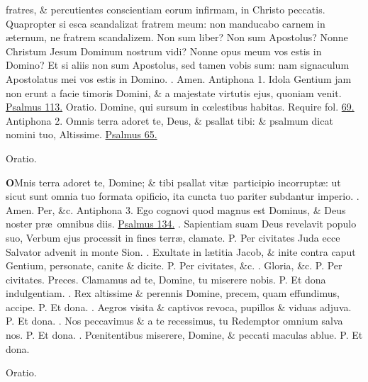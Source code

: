 \documentclass[letter,11pt]{book}
\makeatletter
\DeclareRobustCommand{\Vbar}{\vers@resp{-0.1em}{V}}
\DeclareRobustCommand{\Rbar}{\vers@resp{0pt}{R}}
\newcommand{\vers@resp@sym}{\raisebox{0.2ex}{\rotatebox[origin=c]{-20}{$\m@th\rceil$}}}
\newcommand{\vers@resp}[2]{%
  {\ooalign{\hidewidth\kern#1\vers@resp@sym\hidewidth\cr#2\cr}}%
}%
\def\P{\color{Red} P. \color{black}}
\def\V{\color{Red} \Vbar . \color{black}}
\def\R{\color{Red} \Rbar . \color{black}}
\makeatother
\begin{document}
\begin{multicols*}{2}
fratres, \& percutientes conscientiam eorum infirmam, in Christo peccatis. Quapropter si esca scandalizat fratrem meum: non manducabo carnem in \ae ternum, ne fratrem scandalizem. Non sum liber? Non sum Apostolus? Nonne Christum Jesum Dominum nostrum vidi? Nonne opus meum vos estis in Domino? Et si aliis non sum Apostolus, sed tamen vobis sum: nam signaculum Apostolatus mei vos estis in Domino. \R Amen.
\newline \color{Red} Antiphona 1. \color{black} Idola Gentium jam non erunt a facie timoris Domini, \& a majestate virtutis ejus, quoniam venit. \color{Red} \hyperlink{ps113}{Psalmus 113.} \color{black}
\newline \color{Red} Oratio. \color{black} Domine, qui sursum in c\oe lestibus habitas. \color{Red} Require fol. \color{black} \hyperlink{page.69}{69.}
\newline \color{Red} Antiphona 2. \color{black} Omnis terra adoret te, Deus, \& psallat tibi: \& psalmum dicat nomini tuo, Altissime. \color{Red} \hyperlink{ps65}{Psalmus 65.} \color{black}
\vspace{-.5em} \begin{center} \color{Red} Oratio. \color{black} \end{center} \vspace{-.5em}
\lettrine[lines=2]{\bfseries \color{Red} O}{}Mnis terra adoret te, Domine; \& tibi psallat vit\ae \ participio incorrupt\ae : ut sicut sunt omnia tuo formata opificio, ita cuncta tuo pariter subdantur imperio. \R Amen. Per, \&c.
\newline \color{Red} Antiphona 3. \color{black} Ego cognovi quod magnus est Dominus, \& Deus noster pr\ae \ omnibus diis. \color{Red} \hyperlink{ps134}{Psalmus 134.} \color{black}
\newline \R Sapientiam suam Deus revelavit populo suo, Verbum ejus processit in fines terr\ae , clamate. \P Per civitates Juda ecce Salvator advenit in monte Sion. \V Exultate in l\ae titia Jacob, \& inite contra caput Gentium, personate, canite \& dicite. \P Per civitates, \&c. \V Gloria, \&c. \P Per civitates.
\newline \color{Red} Preces. \color{black} Clamamus ad te, Domine, tu miserere nobis. \P Et dona indulgentiam. \V Rex altissime \& perennis Domine, precem, quam effundimus, accipe. \P Et dona. \V Aegros visita \& captivos revoca, pupillos \& viduas adjuva. \P Et dona. \V Nos peccavimus \& a te recessimus, tu Redemptor omnium salva nos. \P Et dona. \V P\oe nitentibus miserere, Domine, \& peccati maculas ablue. \P Et dona.
\vspace{-.5em} \begin{center} \color{Red} Oratio. \color{black} \end{center} \vspace{-.5em}

\end{multicols*}
\end{document}
